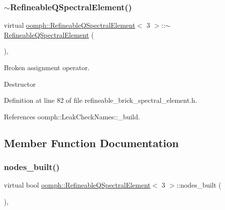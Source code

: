 \subsubsection{\texorpdfstring{$\sim$\+Refineable\+Q\+Spectral\+Element()}{~RefineableQSpectralElement()}}
{\footnotesize\ttfamily virtual \hyperlink{classoomph_1_1RefineableQSpectralElement}{oomph\+::\+Refineable\+Q\+Spectral\+Element}$<$ 3 $>$\+::$\sim$\hyperlink{classoomph_1_1RefineableQSpectralElement}{Refineable\+Q\+Spectral\+Element} (\begin{DoxyParamCaption}{ }\end{DoxyParamCaption})\hspace{0.3cm}{\ttfamily [inline]}, {\ttfamily [virtual]}}



Broken assignment operator. 

Destructor 

Definition at line 82 of file refineable\+\_\+brick\+\_\+spectral\+\_\+element.\+h.



References oomph\+::\+Leak\+Check\+Names\+::\+\_\+build.



\subsection{Member Function Documentation}
\mbox{\label{classoomph_1_1RefineableQSpectralElement_3_013_01_4_a7e8e8d5ed170fef28820dae9748a1e99}} 
\subsubsection{\texorpdfstring{nodes\+\_\+built()}{nodes\_built()}}
{\footnotesize\ttfamily virtual bool \hyperlink{classoomph_1_1RefineableQSpectralElement}{oomph\+::\+Refineable\+Q\+Spectral\+Element}$<$ 3 $>$\+::nodes\+\_\+built (\begin{DoxyParamCaption}{ }\end{DoxyParamCaption})\hspace{0.3cm}{\ttfamily [inline]}, {\ttfamily [virtual]}}



